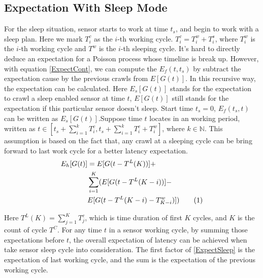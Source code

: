 \documentclass[conference]{IEEEtran}
\newcommand\numberthis{\addtocounter{equation}{1}\tag{\theequation}}
\begin{document}
\subsection{Expectation With Sleep Mode}
For the sleep situation, sensor starts to work at time $t_s$, and begin to work with a sleep plan.
Here we mark $T^{c}_{i}$ as the $i$-th working cycle. $T^{c}_{i} = T^{w}_{i}+T^{s}_{i}$, where $T^{w}_{i}$ is the $i$-th working cycle and $T^{w}$ is the $i$-th sleeping cycle. 
It's hard to directly deduce an expectation for a Poisson process whose timeline is break up. However, with equation \eqref{ExpectCont}, we can compute the $E_f(t, t_s)$ by subtract the expectation cause by the previous crawls from $E[G(t)]$. In this recursive way, the expectation can be calculated. Here $E_s[G(t)]$ stands for the expectation to crawl a sleep enabled sensor at time $t$, $E[G(t)]$ still stands for the expectation if this particular sensor doesn't sleep.
Start time $t_s=0$, $E_f(t_s,t)$ can be written as $E_s[G(t)]$.Suppose time $t$ locates in an working period, written as $t \in [t_s + \sum_{i=1}^{k} T^{c}_{i}, t_s + \sum_{i=1}^{k} T^{c}_{i} + T^{w}_{i}]$, where $k\in\mathbb{N}$. This assumption is based on the fact that, any crawl at a sleeping cycle can be bring forward to last work cycle for a better latency expectation.
\begin{align*}
E_h[G(t)] & = E[G(t-T^{L}(K))] + \\
	& \sum_{i=1}^{K}(E[G(t-T^{L}(K-i))]-\\
	& E[G(t-T^{L}(K-i)-T^{w}_{K-i})]) \numberthis \label{ExpectSleep}
\end{align*}

Here $T^{L}(K) = \sum_{j=1}^{K} T^{c}_{j}$, which is time duration of first $K$ cycles, and $K$ is the count of cycle $T^{C}$. 
For any time $t$ in a sensor working cycle, by summing those expectations before $t$, the overall expectation of latency can be achieved when take sensor sleep cycle into consideration. The first factor of \eqref{ExpectSleep} is the expectation of last working cycle, and the sum is the expectation of the previous working cycle.
\end{document}
